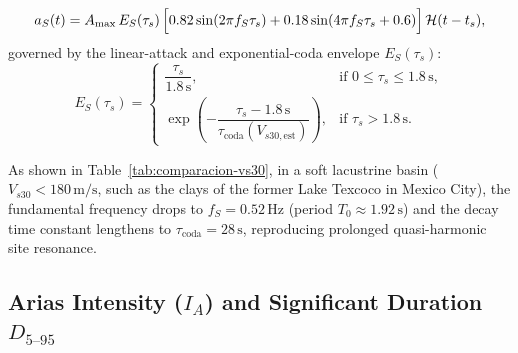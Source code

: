 \documentclass[11pt,a4paper]{article}
\newcommand{\unit}[1]{\mathrm{#1}}
\begin{document}
\begin{enumerate}
\begin{equation}
          a_S(t) = A_{\max}\,E_S(\tau_s)\,\Bigl[
            0.82\sin(2\pi f_S \tau_s) + 0.18\sin(4\pi f_S \tau_s + 0.6)
          \Bigr]\,\mathcal{H}(t - t_s),
          \label{eq:sismo-onda-s}
        \end{equation}
        governed by the linear-attack and exponential-coda envelope $E_S(\tau_s)$:
        \begin{equation}
          E_S(\tau_s) =
          \begin{cases}
            \dfrac{\tau_s}{1.8\,\unit{s}}, & \text{if } 0 \le \tau_s \le 1.8\,\unit{s},\\[8pt]
            \exp\!\left(-\dfrac{\tau_s - 1.8\,\unit{s}}{\tau_{\mathrm{coda}}(V_{s30,\mathrm{est}})}\right), &
              \text{if } \tau_s > 1.8\,\unit{s}.
          \end{cases}
          \label{eq:envolvente-s}
        \end{equation}
\end{enumerate}
As shown in Table~\ref{tab:comparacion-vs30}, in a soft lacustrine basin ($V_{s30} < 180\,\unit{m/s}$, such as
the clays of the former Lake Texcoco in Mexico City), the fundamental frequency drops to
$f_S = 0.52\,\unit{Hz}$ (period $T_0 \approx 1.92\,\unit{s}$) and the decay time constant lengthens to
$\tau_{\mathrm{coda}} = 28\,\unit{s}$, reproducing prolonged quasi-harmonic site resonance.

\subsection{Arias Intensity (\texorpdfstring{$I_A$}{IA}) and Significant Duration \texorpdfstring{$D_{5\text{--}95}$}{D5-95}}
\label{sec:sismo-arias}
\end{document}
